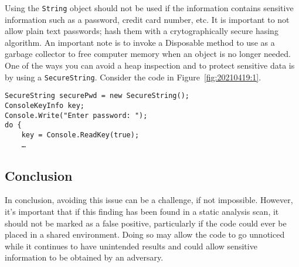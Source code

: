 Using the \texttt{String} object should not be used if the information contains sensitive information such as a password, credit card number, etc. It is important to not allow plain text passwords; hash them with a crytographically secure hasing algorithm. An important note is to invoke a Disposable method to use as a garbage collector to free computer memory when an object is no longer needed. One of the ways you can avoid a heap inspection and to protect sensitive data is by using a \texttt{SecureString}. Consider the code in Figure~\ref{fig:20210419:1}.\autocites{20210419-codeproject}{20210419-swain}

\begin{lstlisting}[caption={SecureString Example},captionpos=b,style=CSharpStyle,basicstyle=\small,label={fig:20210419:1}]
SecureString securePwd = new SecureString();
ConsoleKeyInfo key;
Console.Write("Enter password: ");
do {
	key = Console.ReadKey(true);
	…
\end{lstlisting}

\subsection{Conclusion}

In conclusion, avoiding this issue can be a challenge, if not impossible. However, it's important that if this finding has been found in a static analysis scan, it should not be marked as a false positive, particularly if the code could ever be placed in a shared environment. Doing so may allow the code to go unnoticed while it continues to have unintended results and could allow sensitive information to be obtained by an adversary.
